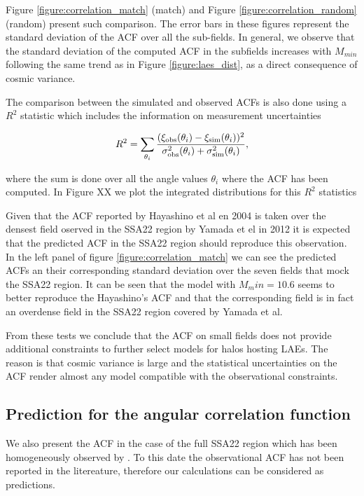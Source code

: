 \documentclass[usenatbib]{mn2e}
\begin{document}
Figure \ref{figure:correlation_match} (match) and Figure
\ref{figure:correlation_random} (random) present such comparison.  The
error bars in these figures represent the standard deviation of the
ACF over all the sub-fields.  In general, we observe that the standard
deviation of the computed ACF in the subfields increases with
$M_{min}$ following the same trend as in Figure
\ref{figure:laes_dist}, as a direct consequence of cosmic variance.  


The comparison between the simulated and observed ACFs is also done using a
$R^2$ statistic which includes the information on measurement uncertainties

\begin{equation}
R^{2} = \sum_{\theta_i} \frac{(\xi_{\rm obs}(\theta_i) - \xi_{\rm
    sim}(\theta_i))^2}{\sigma_{\rm obs}^2(\theta_i) + \sigma_{\rm
    sim}^2({\theta_i})}, 
\end{equation}

where the sum is done over all the angle values $\theta_i$ where the
ACF has been computed. In Figure XX we plot the integrated
distributions for this $R^{2}$ statistics 




Given that the ACF reported by Hayashino et al en 2004 is taken over
the densest  field oserved in the SSA22 region by  Yamada et el in
2012 it is expected that the predicted ACF in the SSA22 region should
reproduce this observation. In the  left panel of figure
\ref{figure:correlation_match} we can see the predicted ACFs  an their
corresponding standard deviation over the seven fields that mock the
SSA22  region. It can be seen that the model with $M_min=10.6$ seems
to better reproduce the  Hayashino's ACF and that the corresponding
field is in fact an overdense field in the SSA22 region covered by
Yamada et al. 

From these tests we conclude that the ACF on small fields does not
provide additional constraints to further select models for halos
hosting LAEs. The reason is that cosmic variance is large and the
statistical uncertainties on the ACF render almost any model
compatible with the observational constraints. 


\subsection{Prediction for the angular correlation function}

We also present the ACF in the case of the full SSA22
region which has been homogeneously observed by \citep{Yamada2012}. To
this date the observational ACF has not been reported in the
litereature, therefore our calculations can be considered as
predictions. 
\end{document}
